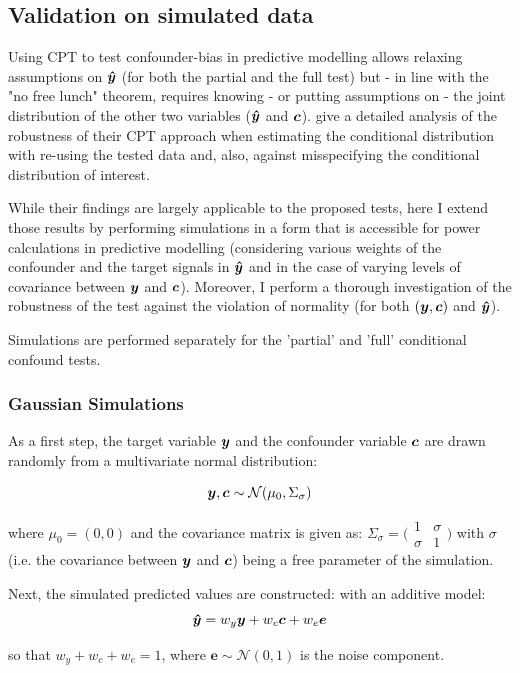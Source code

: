 \documentclass{article}
\begin{document}
\subsection{Validation on simulated data}

Using CPT to test confounder-bias in predictive modelling allows relaxing assumptions on $\boldsymbol{\hat{y}}$ (for both the partial and the full test) but - in line with the "no free lunch" theorem, requires knowing - or putting assumptions on - the joint distribution of the other two variables ($\boldsymbol{\hat{y}}$ and $\boldsymbol{c}$). 
\cite{berrett2020conditional} give a detailed analysis of the robustness of their CPT approach when estimating the conditional distribution with re-using the tested data and, also, against misspecifying the conditional distribution of interest.

While their findings are largely applicable to the proposed tests, here I extend those results by performing simulations in a form that is accessible for power calculations in predictive modelling (considering various weights of the confounder and the target signals in $\boldsymbol{\hat{y}}$ and in the case of varying levels of covariance between $\boldsymbol{y}$ and $\boldsymbol{c}$).
Moreover, I perform a thorough investigation of the robustness of the test against the violation of normality (for both $(\boldsymbol{y}, \boldsymbol{c})$ and $\boldsymbol{\hat{y}}$).

Simulations are performed separately for the 'partial' and 'full' conditional confound tests.

\subsubsection*{Gaussian Simulations}
As  a first step, the target variable $\boldsymbol{y}$ and the confounder variable $\boldsymbol{c}$ are drawn randomly from a multivariate normal distribution:

$$ \boldsymbol{y}, \boldsymbol{c} \sim \mathcal{N}(\mu_0, \Sigma_\sigma) $$

where $\mu_0=(0, 0)$ and the covariance matrix is given as:
$\Sigma_\sigma = \big(\begin{smallmatrix}
  1 & \sigma\\
  \sigma & 1
\end{smallmatrix}\big)$ with $\sigma$ (i.e. the covariance between $\boldsymbol{y}$ and $\boldsymbol{c}$) being a free parameter of the simulation.

Next, the simulated predicted values are constructed:
 with an additive model:
$$ \boldsymbol{\hat{y}} = w_y \boldsymbol{y} + w_c \boldsymbol{c} + w_e \boldsymbol{e}$$

so that $w_y + w_c + w_e = 1$, where $\boldsymbol{e} \sim \mathcal{N}(0,1)$ is the noise component.
\end{document}

